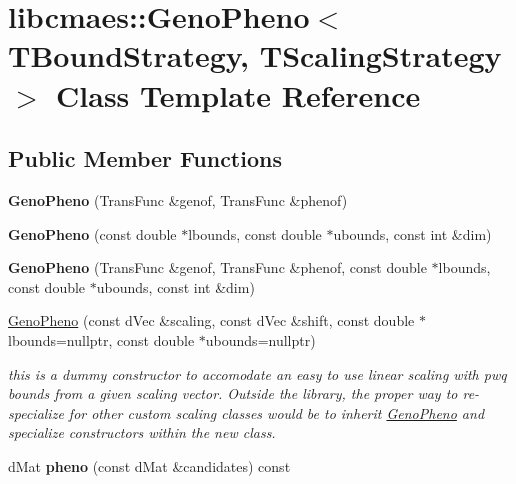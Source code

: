 \hypertarget{classlibcmaes_1_1GenoPheno}{\section{libcmaes\+:\+:Geno\+Pheno$<$ T\+Bound\+Strategy, T\+Scaling\+Strategy $>$ Class Template Reference}
\label{classlibcmaes_1_1GenoPheno}
}
\subsection*{Public Member Functions}
\begin{DoxyCompactItemize}
\item 
\hypertarget{classlibcmaes_1_1GenoPheno_aae14b1407d7f853c55e5f3c693488006}{{\bfseries Geno\+Pheno} (Trans\+Func \&genof, Trans\+Func \&phenof)}\label{classlibcmaes_1_1GenoPheno_aae14b1407d7f853c55e5f3c693488006}

\item 
\hypertarget{classlibcmaes_1_1GenoPheno_a0b4b5ba6314a4ad73a8512ac6f3c096e}{{\bfseries Geno\+Pheno} (const double $\ast$lbounds, const double $\ast$ubounds, const int \&dim)}\label{classlibcmaes_1_1GenoPheno_a0b4b5ba6314a4ad73a8512ac6f3c096e}

\item 
\hypertarget{classlibcmaes_1_1GenoPheno_a76385d259b9f382fe18fdc988bcb68e1}{{\bfseries Geno\+Pheno} (Trans\+Func \&genof, Trans\+Func \&phenof, const double $\ast$lbounds, const double $\ast$ubounds, const int \&dim)}\label{classlibcmaes_1_1GenoPheno_a76385d259b9f382fe18fdc988bcb68e1}

\item 
\hyperlink{classlibcmaes_1_1GenoPheno_a33c22441a0688582c5aa723d8336d3c6}{Geno\+Pheno} (const d\+Vec \&scaling, const d\+Vec \&shift, const double $\ast$lbounds=nullptr, const double $\ast$ubounds=nullptr)
\begin{DoxyCompactList}\small\item\em this is a dummy constructor to accomodate an easy to use linear scaling with pwq bounds from a given scaling vector. Outside the library, the proper way to re-\/specialize for other custom scaling classes would be to inherit \hyperlink{classlibcmaes_1_1GenoPheno}{Geno\+Pheno} and specialize constructors within the new class. \end{DoxyCompactList}\item 
\hypertarget{classlibcmaes_1_1GenoPheno_a19c02b0a3179a3fc5f991b78d639fc5a}{d\+Mat {\bfseries pheno} (const d\+Mat \&candidates) const }\label{classlibcmaes_1_1GenoPheno_a19c02b0a3179a3fc5f991b78d639fc5a}


\end{DoxyCompactItemize}
